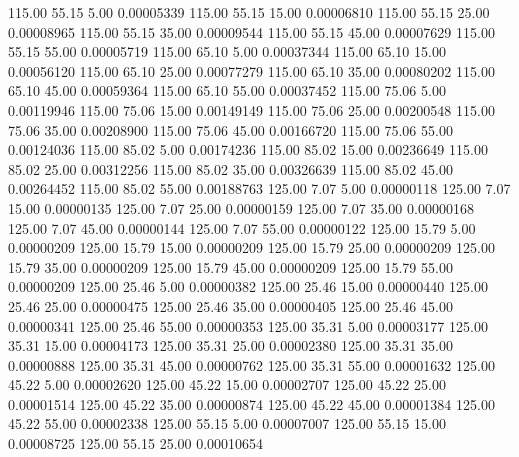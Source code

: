     115.00     55.15      5.00     0.00005339
    115.00     55.15     15.00     0.00006810
    115.00     55.15     25.00     0.00008965
    115.00     55.15     35.00     0.00009544
    115.00     55.15     45.00     0.00007629
    115.00     55.15     55.00     0.00005719
    115.00     65.10      5.00     0.00037344
    115.00     65.10     15.00     0.00056120
    115.00     65.10     25.00     0.00077279
    115.00     65.10     35.00     0.00080202
    115.00     65.10     45.00     0.00059364
    115.00     65.10     55.00     0.00037452
    115.00     75.06      5.00     0.00119946
    115.00     75.06     15.00     0.00149149
    115.00     75.06     25.00     0.00200548
    115.00     75.06     35.00     0.00208900
    115.00     75.06     45.00     0.00166720
    115.00     75.06     55.00     0.00124036
    115.00     85.02      5.00     0.00174236
    115.00     85.02     15.00     0.00236649
    115.00     85.02     25.00     0.00312256
    115.00     85.02     35.00     0.00326639
    115.00     85.02     45.00     0.00264452
    115.00     85.02     55.00     0.00188763
    125.00      7.07      5.00     0.00000118
    125.00      7.07     15.00     0.00000135
    125.00      7.07     25.00     0.00000159
    125.00      7.07     35.00     0.00000168
    125.00      7.07     45.00     0.00000144
    125.00      7.07     55.00     0.00000122
    125.00     15.79      5.00     0.00000209
    125.00     15.79     15.00     0.00000209
    125.00     15.79     25.00     0.00000209
    125.00     15.79     35.00     0.00000209
    125.00     15.79     45.00     0.00000209
    125.00     15.79     55.00     0.00000209
    125.00     25.46      5.00     0.00000382
    125.00     25.46     15.00     0.00000440
    125.00     25.46     25.00     0.00000475
    125.00     25.46     35.00     0.00000405
    125.00     25.46     45.00     0.00000341
    125.00     25.46     55.00     0.00000353
    125.00     35.31      5.00     0.00003177
    125.00     35.31     15.00     0.00004173
    125.00     35.31     25.00     0.00002380
    125.00     35.31     35.00     0.00000888
    125.00     35.31     45.00     0.00000762
    125.00     35.31     55.00     0.00001632
    125.00     45.22      5.00     0.00002620
    125.00     45.22     15.00     0.00002707
    125.00     45.22     25.00     0.00001514
    125.00     45.22     35.00     0.00000874
    125.00     45.22     45.00     0.00001384
    125.00     45.22     55.00     0.00002338
    125.00     55.15      5.00     0.00007007
    125.00     55.15     15.00     0.00008725
    125.00     55.15     25.00     0.00010654
